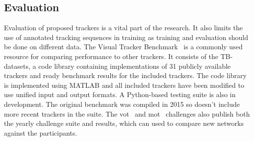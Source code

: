 \subsection{Evaluation}
Evaluation of proposed trackers is a vital part of the research. It also limits the use
of annotated tracking sequences in training as training and evaluation should be done
on different data.
The Visual Tracker Benchmark~\cite{VTB} is a commonly used resource for comparing
performance to other trackers. It consists of the TB-datasets, a code library containing
implementations of 31 publicly available trackers and ready benchmark results for the
included trackers. The code library is implemented using MATLAB and all included trackers
have been modified to use unified input and output formats. A Python-based testing suite
is also in development. The original benchmark was compiled in 2015 so doesn't include
more recent trackers in the suite. The \ac{vot}~\cite{VOT} and \ac{mot}~\cite{MOT16}
challenges also publish both the yearly challenge suite and results, which can used to
compare new networks against the participants.
